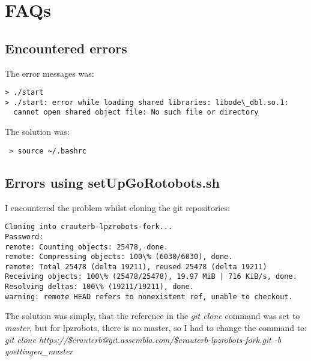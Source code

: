 \section{FAQs}

\subsection{Encountered errors}

The error messages was:

\begin{lstlisting}
> ./start
> ./start: error while loading shared libraries: libode\_dbl.so.1: 
  cannot open shared object file: No such file or directory
\end{lstlisting}
The solution was:
\begin{lstlisting}
 > source ~/.bashrc
\end{lstlisting}


\subsection{Errors using setUpGoRotobots.sh}

I encountered the problem whilst cloning the git repositories:
\begin{lstlisting}
Cloning into crauterb-lpzrobots-fork...
Password: 
remote: Counting objects: 25478, done.
remote: Compressing objects: 100\% (6030/6030), done.
remote: Total 25478 (delta 19211), reused 25478 (delta 19211)
Receiving objects: 100\% (25478/25478), 19.97 MiB | 716 KiB/s, done.
Resolving deltas: 100\% (19211/19211), done.
warning: remote HEAD refers to nonexistent ref, unable to checkout.
\end{lstlisting}
The solution was simply, that the reference in the \emph{git clone} command was set
to \emph{master}, but for lpzrobots, there is no master, so I had to change the command to: \\
\emph{git clone https://\$crauterb@git.assembla.com/\$crauterb-lpzrobots-fork.git -b goettingen\_master} \\

